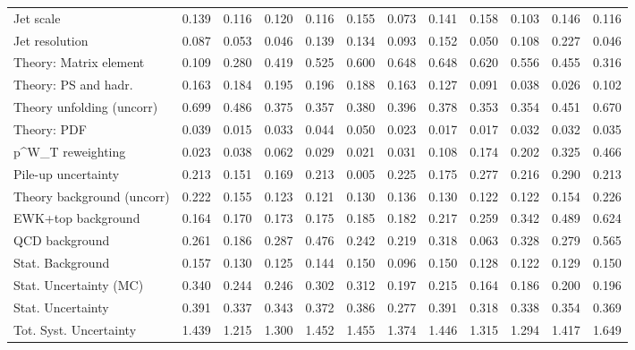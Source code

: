 \begin{tabular}{l|p{0.6cm}p{0.6cm}p{0.6cm}p{0.6cm}p{0.6cm}p{0.6cm}p{0.6cm}p{0.6cm}p{0.6cm}p{0.6cm}p{0.6cm}}
Jet scale                                & 0.139 & 0.116 & 0.120 & 0.116 & 0.155 & 0.073 & 0.141 & 0.158 & 0.103 & 0.146 & 0.116 \\
Jet resolution                           & 0.087 & 0.053 & 0.046 & 0.139 & 0.134 & 0.093 & 0.152 & 0.050 & 0.108 & 0.227 & 0.046 \\
Theory: Matrix element                   & 0.109 & 0.280 & 0.419 & 0.525 & 0.600 & 0.648 & 0.648 & 0.620 & 0.556 & 0.455 & 0.316 \\
Theory: PS and hadr.                     & 0.163 & 0.184 & 0.195 & 0.196 & 0.188 & 0.163 & 0.127 & 0.091 & 0.038 & 0.026 & 0.102 \\
Theory unfolding (uncorr)                & 0.699 & 0.486 & 0.375 & 0.357 & 0.380 & 0.396 & 0.378 & 0.353 & 0.354 & 0.451 & 0.670 \\
Theory: PDF                              & 0.039 & 0.015 & 0.033 & 0.044 & 0.050 & 0.023 & 0.017 & 0.017 & 0.032 & 0.032 & 0.035 \\
p^{W}_{T} reweighting                    & 0.023 & 0.038 & 0.062 & 0.029 & 0.021 & 0.031 & 0.108 & 0.174 & 0.202 & 0.325 & 0.466 \\
Pile-up uncertainty                      & 0.213 & 0.151 & 0.169 & 0.213 & 0.005 & 0.225 & 0.175 & 0.277 & 0.216 & 0.290 & 0.213 \\
Theory background (uncorr)               & 0.222 & 0.155 & 0.123 & 0.121 & 0.130 & 0.136 & 0.130 & 0.122 & 0.122 & 0.154 & 0.226 \\
EWK+top background                       & 0.164 & 0.170 & 0.173 & 0.175 & 0.185 & 0.182 & 0.217 & 0.259 & 0.342 & 0.489 & 0.624 \\
QCD background                           & 0.261 & 0.186 & 0.287 & 0.476 & 0.242 & 0.219 & 0.318 & 0.063 & 0.328 & 0.279 & 0.565 \\
Stat. Background                         & 0.157 & 0.130 & 0.125 & 0.144 & 0.150 & 0.096 & 0.150 & 0.128 & 0.122 & 0.129 & 0.150 \\
Stat. Uncertainty (MC)                   & 0.340 & 0.244 & 0.246 & 0.302 & 0.312 & 0.197 & 0.215 & 0.164 & 0.186 & 0.200 & 0.196 \\
\hline
Stat. Uncertainty                        & 0.391 & 0.337 & 0.343 & 0.372 & 0.386 & 0.277 & 0.391 & 0.318 & 0.338 & 0.354 & 0.369 \\
\hline
Tot. Syst. Uncertainty                   & 1.439 & 1.215 & 1.300 & 1.452 & 1.455 & 1.374 & 1.446 & 1.315 & 1.294 & 1.417 & 1.649 \\
\hline
\end{tabular}
